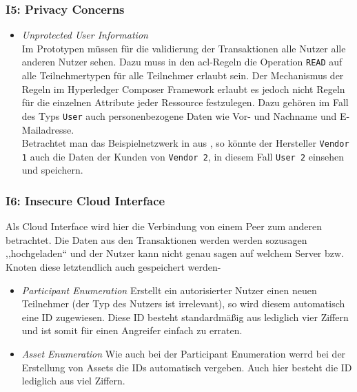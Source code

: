         \subsubsection*{I5: Privacy Concerns}
            \begin{itemize}[leftmargin=0cm,label={}]
                \item \emph{Unprotected User Information}\label{vuln:prototype_userdata}\\
                    Im Prototypen müssen für die validierung der Transaktionen alle Nutzer alle anderen Nutzer sehen. 
                    Dazu muss in den \gls{acl}-Regeln die Operation \colorbox{light-gray}{\lstinline{READ}} auf alle Teilnehmertypen für alle Teilnehmer erlaubt sein. 
                    Der Mechanismus der Regeln im Hyperledger Composer Framework erlaubt es jedoch nicht Regeln für die einzelnen Attribute jeder Ressource festzulegen. 
                    Dazu gehören im Fall des Typs \colorbox{light-gray}{\lstinline{User}} auch personenbezogene Daten wie Vor- und Nachname und E-Mailadresse.\\
                    Betrachtet man das Beispielnetzwerk in  aus , so könnte der Hersteller \colorbox{light-gray}{\lstinline{Vendor 1}} auch die Daten der Kunden von \colorbox{light-gray}{\lstinline{Vendor 2}}, in diesem Fall \colorbox{light-gray}{\lstinline{User 2}} einsehen und speichern.
            \end{itemize}
            
        \subsubsection*{I6: Insecure Cloud Interface}
            Als Cloud Interface wird hier die Verbindung von einem Peer zum anderen betrachtet.
            Die Daten aus den Transaktionen werden werden sozusagen ,,hochgeladen`` und der Nutzer kann nicht genau sagen auf welchem Server bzw. Knoten diese letztendlich auch gespeichert werden-
            \begin{itemize}[leftmargin=0cm,label={}]
                \item \emph{Participant Enumeration}\label{vuln:prototype_enum_part}
                    Erstellt ein autorisierter Nutzer einen neuen Teilnehmer (der Typ des Nutzers ist irrelevant), so wird diesem automatisch eine ID zugewiesen. 
                    Diese ID besteht standardmäßig aus lediglich vier Ziffern und ist somit für einen Angreifer einfach zu erraten.
                \item \emph{Asset Enumeration}\label{vuln:prototype_enum_asset}
                    Wie auch bei der Participant Enumeration werrd bei der Erstellung von Assets die IDs automatisch vergeben. 
                    Auch hier besteht die ID lediglich aus viel Ziffern.
            \end{itemize}
            
